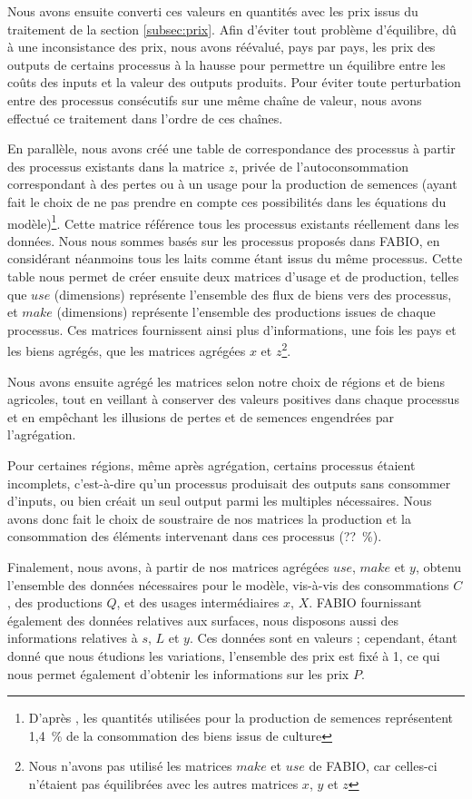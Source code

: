 Nous avons ensuite converti ces valeurs en quantités avec les prix issus du traitement de la section \ref{subsec:prix}. Afin d'éviter tout problème d'équilibre, dû à une inconsistance des prix, nous avons réévalué, pays par pays, les prix des outputs de certains processus à la hausse pour permettre un équilibre entre les coûts des inputs et la valeur des outputs produits. Pour éviter toute perturbation entre des processus consécutifs sur une même chaîne de valeur, nous avons effectué ce traitement dans l'ordre de ces chaînes.

En parallèle, nous avons créé une table de correspondance des processus à partir des processus existants dans la matrice $z$, privée de l'autoconsommation correspondant à des pertes ou à un usage pour la production de semences (ayant fait le choix de ne pas prendre en compte ces possibilités dans les équations du modèle)\footnote{D'après \cite{Bruckner2019}, les quantités utilisées pour la production de semences représentent 1,4~\% de la consommation des biens issus de culture}. Cette matrice référence tous les processus existants réellement dans les données. Nous nous sommes basés sur les processus proposés dans FABIO, en considérant néanmoins tous les laits comme étant issus du même processus. Cette table nous permet de créer ensuite deux matrices d'usage et de production, telles que $use$ (dimensions) représente l'ensemble des flux de biens vers des processus, et $make$ (dimensions) représente l'ensemble des productions issues de chaque processus. Ces matrices fournissent ainsi plus d'informations, une fois les pays et les biens agrégés, que les matrices agrégées $x$ et $z$\footnote{Nous n'avons pas utilisé les matrices $make$ et $use$ de FABIO, car celles-ci n'étaient pas équilibrées avec les autres matrices $x$, $y$ et $z$}.

Nous avons ensuite agrégé les matrices selon notre choix de régions et de biens agricoles, tout en veillant à conserver des valeurs positives dans chaque processus et en empêchant les illusions de pertes et de semences engendrées par l'agrégation.

Pour certaines régions, même après agrégation, certains processus étaient incomplets, c'est-à-dire qu'un processus produisait des outputs sans consommer d'inputs, ou bien créait un seul output parmi les multiples nécessaires. Nous avons donc fait le choix de soustraire de nos matrices la production et la consommation des éléments intervenant dans ces processus (??~\%).

Finalement, nous avons, à partir de nos matrices agrégées $use$, $make$ et $y$, obtenu l'ensemble des données nécessaires pour le modèle, vis-à-vis des consommations $C$, des productions $Q$, et des usages intermédiaires $x$, $X$. FABIO fournissant également des données relatives aux surfaces, nous disposons aussi des informations relatives à $s$, $L$ et $y$. Ces données sont en valeurs ; cependant, étant donné que nous étudions les variations, l'ensemble des prix est fixé à 1, ce qui nous permet également d'obtenir les informations sur les prix $P$.


